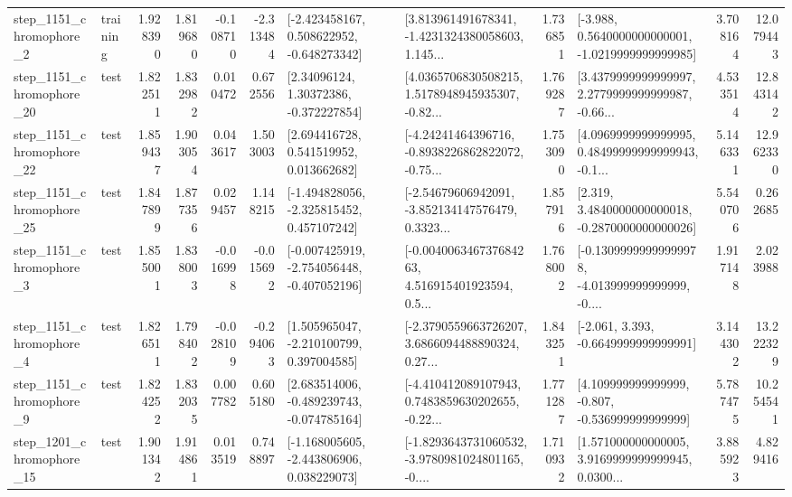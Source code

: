 \begin{tabular}{llrrrrllrlrr}
  step\_1151\_chromophore\_2 &  training &      1.928390 &    1.819680 &     -0.108710 & -2.313484 &   [-2.423458167, 0.508622952, -0.648273342] &  [3.813961491678341, -1.4231324380058603, 1.145... &       1.736851 &  [-3.988, 0.5640000000000001, -1.0219999999999985] &            3.708164 &         12.079443 \\
 step\_1151\_chromophore\_20 &      test &      1.822511 &    1.832982 &      0.010472 &  0.672556 &      [2.34096124, 1.30372386, -0.372227854] &  [4.0365706830508215, 1.5178948945935307, -0.82... &       1.769287 &  [3.4379999999999997, 2.2779999999999987, -0.66... &            4.533514 &         12.843142 \\
 step\_1151\_chromophore\_22 &      test &      1.859437 &    1.903054 &      0.043617 &  1.503003 &     [2.694416728, 0.541519952, 0.013662682] &  [-4.24241464396716, -0.8938226862822072, -0.75... &       1.753090 &  [4.0969999999999995, 0.48499999999999943, -0.1... &            5.146331 &         12.962330 \\
 step\_1151\_chromophore\_25 &      test &      1.847899 &    1.877356 &      0.029457 &  1.148215 &   [-1.494828056, -2.325815452, 0.457107242] &  [-2.54679606942091, -3.852134147576479, 0.3323... &       1.857916 &   [2.319, 3.4840000000000018, -0.2870000000000026] &            5.540706 &          0.262685 \\
  step\_1151\_chromophore\_3 &      test &      1.855001 &    1.838003 &     -0.016998 & -0.015692 &  [-0.007425919, -2.754056448, -0.407052196] &  [-0.004006346737684263, 4.516915401923594, 0.5... &       1.768002 &  [-0.13099999999999978, -4.013999999999999, -0.... &            1.917148 &          2.023988 \\
  step\_1151\_chromophore\_4 &      test &      1.826511 &    1.798402 &     -0.028109 & -0.294063 &    [1.505965047, -2.210100799, 0.397004585] &  [-2.3790559663726207, 3.6866094488890324, 0.27... &       1.843251 &               [-2.061, 3.393, -0.6649999999999991] &            3.144302 &         13.222329 \\
  step\_1151\_chromophore\_9 &      test &      1.824252 &    1.832035 &      0.007782 &  0.605180 &   [2.683514006, -0.489239743, -0.074785164] &  [-4.410412089107943, 0.7483859630202655, -0.22... &       1.771287 &    [4.109999999999999, -0.807, -0.536999999999999] &            5.787475 &         10.254541 \\
 step\_1201\_chromophore\_15 &      test &      1.901342 &    1.914861 &      0.013519 &  0.748897 &   [-1.168005605, -2.443806906, 0.038229073] &  [-1.8293643731060532, -3.9780981024801165, -0.... &       1.710932 &  [1.571000000000005, 3.9169999999999945, 0.0300... &            3.885923 &          4.829416 \\

\end{tabular}
